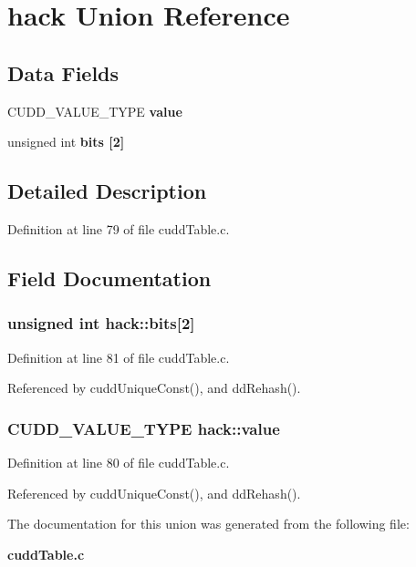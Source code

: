 \section{hack Union Reference}
\label{unionhack}
\subsection*{Data Fields}
\begin{CompactItemize}
\item 
CUDD\_\-VALUE\_\-TYPE \bf{value}
\item 
unsigned int \bf{bits} [2]
\end{CompactItemize}


\subsection{Detailed Description}




Definition at line 79 of file cudd\-Table.c.

\subsection{Field Documentation}
\subsubsection{\setlength{\rightskip}{0pt plus 5cm}unsigned int \bf{hack::bits}[2]}\label{unionhack_c9f31214d556c4a179ba01f23036bc91}




Definition at line 81 of file cudd\-Table.c.

Referenced by cudd\-Unique\-Const(), and dd\-Rehash().
\subsubsection{\setlength{\rightskip}{0pt plus 5cm}CUDD\_\-VALUE\_\-TYPE \bf{hack::value}}\label{unionhack_57925aea3fe6bc712a7d34f05e3c31f4}




Definition at line 80 of file cudd\-Table.c.

Referenced by cudd\-Unique\-Const(), and dd\-Rehash().

The documentation for this union was generated from the following file:\begin{CompactItemize}
\item 
\bf{cudd\-Table.c}\end{CompactItemize}
